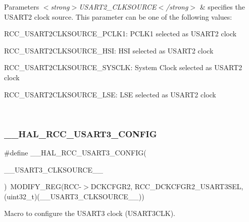 \begin{DoxyParams}{Parameters}
{\em $<$strong$>$\+U\+S\+A\+R\+T2\+\_\+\+C\+L\+K\+S\+O\+U\+R\+C\+E$<$/strong$>$} & specifies the U\+S\+A\+R\+T2 clock source. This parameter can be one of the following values\+: \begin{DoxyItemize}
\item R\+C\+C\+\_\+\+U\+S\+A\+R\+T2\+C\+L\+K\+S\+O\+U\+R\+C\+E\+\_\+\+P\+C\+L\+K1\+: P\+C\+L\+K1 selected as U\+S\+A\+R\+T2 clock \item R\+C\+C\+\_\+\+U\+S\+A\+R\+T2\+C\+L\+K\+S\+O\+U\+R\+C\+E\+\_\+\+H\+SI\+: H\+SI selected as U\+S\+A\+R\+T2 clock \item R\+C\+C\+\_\+\+U\+S\+A\+R\+T2\+C\+L\+K\+S\+O\+U\+R\+C\+E\+\_\+\+S\+Y\+S\+C\+LK\+: System Clock selected as U\+S\+A\+R\+T2 clock \item R\+C\+C\+\_\+\+U\+S\+A\+R\+T2\+C\+L\+K\+S\+O\+U\+R\+C\+E\+\_\+\+L\+SE\+: L\+SE selected as U\+S\+A\+R\+T2 clock \end{DoxyItemize}
\\
\hline
\end{DoxyParams}
\mbox{\label{group___r_c_c_ex___exported___macros_ga732383844537c59f16d5882a8fa1670d}} 
\subsubsection{\texorpdfstring{\_\_HAL\_RCC\_USART3\_CONFIG}{\_\_HAL\_RCC\_USART3\_CONFIG}}
{\footnotesize\ttfamily \#define \+\_\+\+\_\+\+H\+A\+L\+\_\+\+R\+C\+C\+\_\+\+U\+S\+A\+R\+T3\+\_\+\+C\+O\+N\+F\+IG(\begin{DoxyParamCaption}\item[{}]{\+\_\+\+\_\+\+U\+S\+A\+R\+T3\+\_\+\+C\+L\+K\+S\+O\+U\+R\+C\+E\+\_\+\+\_\+ }\end{DoxyParamCaption})~M\+O\+D\+I\+F\+Y\+\_\+\+R\+EG(R\+CC-\/$>$D\+C\+K\+C\+F\+G\+R2, R\+C\+C\+\_\+\+D\+C\+K\+C\+F\+G\+R2\+\_\+\+U\+S\+A\+R\+T3\+S\+EL, (uint32\+\_\+t)(\+\_\+\+\_\+\+U\+S\+A\+R\+T3\+\_\+\+C\+L\+K\+S\+O\+U\+R\+C\+E\+\_\+\+\_\+))}



Macro to configure the U\+S\+A\+R\+T3 clock (U\+S\+A\+R\+T3\+C\+LK). 


